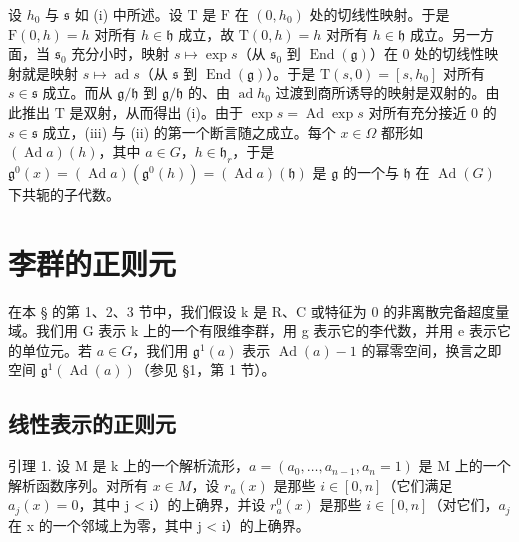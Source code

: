 设 \(h_0\) 与 \(\mathfrak{s}\) 如 (i) 中所述。设 \(\mathrm{T}\) 是 \(\mathrm{F}\) 在 \((0, h_0)\) 处的切线性映射。于是 \(\mathrm{F}(0, h) = h\) 对所有 \(h \in \mathfrak{h}\) 成立，故 \(\mathrm{T}(0, h) = h\) 对所有 \(h \in \mathfrak{h}\) 成立。另一方面，当 \(\mathfrak{s}_0\) 充分小时，映射 \(s \mapsto \exp s\)（从 \(\mathfrak{s}_0\) 到 \(\operatorname{End}(\mathfrak{g})\)）在 0 处的切线性映射就是映射 \(s \mapsto \operatorname{ad}s\)（从 \(\mathfrak{s}\) 到 \(\operatorname{End}(\mathfrak{g})\)）。于是 \(\mathrm{T}(s, 0) = [s, h_0]\) 对所有 \(s \in \mathfrak{s}\) 成立。而从 \(\mathfrak{g}/\mathfrak{h}\) 到 \(\mathfrak{g}/\mathfrak{h}\) 的、由 \(\operatorname{ad}h_0\) 过渡到商所诱导的映射是双射的。由此推出 \(\mathrm{T}\) 是双射，从而得出 (i)。由于 \(\exp s = \operatorname{Ad}\exp s\) 对所有充分接近 0 的 \(s \in \mathfrak{s}\) 成立，(iii) 与 (ii) 的第一个断言随之成立。每个 \(x \in \Omega\) 都形如 \((\operatorname{Ad}a)(h)\)，其中 \(a \in G\)，\(h \in \mathfrak{h}_r\)，于是 \(\mathfrak{g}^0(x) = (\operatorname{Ad}a)(\mathfrak{g}^0(h)) = (\operatorname{Ad}a)(\mathfrak{h})\) 是 \(\mathfrak{g}\) 的一个与 \(\mathfrak{h}\) 在 \(\operatorname{Ad}(G)\) 下共轭的子代数。

\section{李群的正则元}

在本 § 的第 1、2、3 节中，我们假设 k 是 R、C 或特征为 0 的非离散完备超度量域。我们用 G 表示 k 上的一个有限维李群，用 g 表示它的李代数，并用 e 表示它的单位元。若 \(a \in G\)，我们用 \(\mathfrak{g}^{1}(a)\) 表示 \(\operatorname{Ad}(a) - 1\) 的幂零空间，换言之即空间 \(\mathfrak{g}^{1}(\operatorname{Ad}(a))\)（参见 §1，第 1 节）。

\subsection{线性表示的正则元}

引理 1. 设 M 是 k 上的一个解析流形，\(a = (a_{0}, \ldots, a_{n-1}, a_{n} = 1)\) 是 M 上的一个解析函数序列。对所有 \(x \in M\)，设 \(r_{a}(x)\) 是那些 \(i \in [0, n]\)（它们满足 \(a_{j}(x) = 0\)，其中 j \textless{} i）的上确界，并设 \(r_{a}^{0}(x)\) 是那些 \(i \in [0, n]\)（对它们，\(a_{j}\) 在 x 的一个邻域上为零，其中 j \textless{} i）的上确界。

